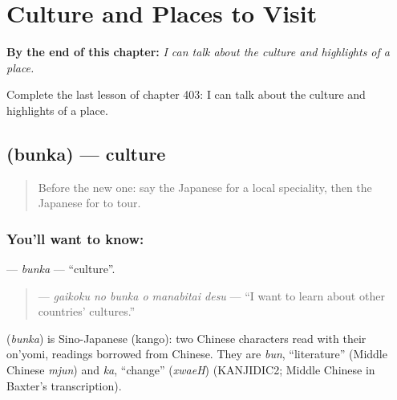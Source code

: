 
\chapter{Culture and Places to Visit}
\label{ch:ja-culture-and-places-to-visit}

\begin{chapteropening}
\textbf{By the end of this chapter:} \emph{I can talk about the culture and highlights of a place.}

Complete the last lesson of chapter 403: I can talk about the culture and highlights of a place.
\end{chapteropening}

\section[\texorpdfstring{\ja{ぶんか} (bunka)}{ぶんか (bunka)}]{ (bunka) — culture}

\label{lesson:JA-C403-bunka}



\begin{quote}
Before the new one: say the Japanese for a local speciality, then the Japanese for to tour.
\end{quote}

\subsection*{You'll want to know: }
\textbf{} — \emph{bunka} — \textquotedblleft{}culture\textquotedblright{}.

\begin{quote}
\textbf{  } — \emph{gaikoku no bunka o manabitai desu} — \textquotedblleft{}I want to learn about other countries' cultures.\textquotedblright{}
\end{quote}

\begin{cousinweb}
\textbf{} (\emph{bunka}) is Sino-Japanese (kango): two Chinese characters read with their on'yomi, readings borrowed from Chinese. They are \emph{bun}, \textquotedblleft{}literature\textquotedblright{} (Middle Chinese \emph{mjun}) and \emph{ka}, \textquotedblleft{}change\textquotedblright{} (\emph{xwaeH}) (KANJIDIC2; Middle Chinese in Baxter's transcription).
\end{cousinweb}

